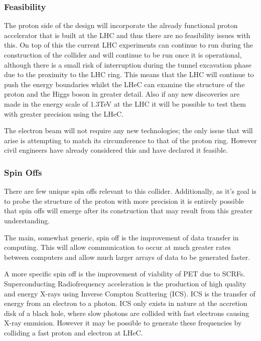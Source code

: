 \subsubsection{Feasibility}

The proton side of the design will incorporate the already functional proton accelerator that is built at the LHC and thus there are no feasibility issues with this. On top of this the current LHC experiments can continue to run during the construction of the collider and will continue to be run once it is operational, although there is a small risk of interruption during the tunnel excavation phase due to the proximity to the LHC ring. This means that the LHC will continue to push the energy boundaries whilst the LHeC can examine the structure of the proton and the Higgs boson in greater detail. Also if any new discoveries are made in the energy scale of 1.3TeV at the LHC it will be possible to test them with greater precision using the LHeC.
 
The electron beam will not require any new technologies; the only issue that will arise is attempting to match its circumference to that of the proton ring. However civil engineers have already considered this and have declared it feasible. \cite{LHeC:Report}
 
\subsubsection{Spin Offs}

There are few unique spin offs relevant to this collider. Additionally, as it's goal is to probe the structure of the proton with more precision it is entirely possible that spin offs will emerge after its construction that may result from this greater understanding.
 
The main, somewhat generic, spin off is the improvement of data transfer in computing. This will allow communication to occur at much greater rates between computers and allow much larger arrays of data to be generated faster.
 
A more specific spin off is the improvement of viability of PET due to SCRFs. Superconducting Radiofrequency acceleration is the production of high quality and energy X-rays using Inverse Compton Scattering (ICS). ICS is the transfer of energy from an electron to a photon. ICS only exists in nature at the accretion disk of a black hole, where slow photons are collided with fast electrons causing X-ray emmision. However it may be possible to generate these frequencies by colliding a fast proton and electron at LHeC.
 
